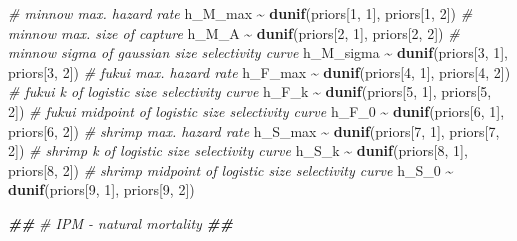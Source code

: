 \documentclass[
]{article}
\newenvironment{Shaded}{\begin{snugshade}}{\end{snugshade}}
\newcommand{\CommentTok}[1]{\textcolor[rgb]{0.56,0.35,0.01}{\textit{#1}}}
\newcommand{\DecValTok}[1]{\textcolor[rgb]{0.00,0.00,0.81}{#1}}
\newcommand{\DocumentationTok}[1]{\textcolor[rgb]{0.56,0.35,0.01}{\textbf{\textit{#1}}}}
\newcommand{\FunctionTok}[1]{\textcolor[rgb]{0.13,0.29,0.53}{\textbf{#1}}}
\newcommand{\NormalTok}[1]{#1}
\newcommand{\SpecialCharTok}[1]{\textcolor[rgb]{0.81,0.36,0.00}{\textbf{#1}}}
\begin{document}
\begin{Shaded}
\begin{Highlighting}[]
  \CommentTok{\# minnow max. hazard rate}
\NormalTok{  h\_M\_max }\SpecialCharTok{\textasciitilde{}} \FunctionTok{dunif}\NormalTok{(priors[}\DecValTok{1}\NormalTok{, }\DecValTok{1}\NormalTok{], priors[}\DecValTok{1}\NormalTok{, }\DecValTok{2}\NormalTok{])}
  \CommentTok{\# minnow max. size of capture}
\NormalTok{  h\_M\_A }\SpecialCharTok{\textasciitilde{}} \FunctionTok{dunif}\NormalTok{(priors[}\DecValTok{2}\NormalTok{, }\DecValTok{1}\NormalTok{], priors[}\DecValTok{2}\NormalTok{, }\DecValTok{2}\NormalTok{])}
  \CommentTok{\# minnow sigma of gaussian size selectivity curve}
\NormalTok{  h\_M\_sigma }\SpecialCharTok{\textasciitilde{}} \FunctionTok{dunif}\NormalTok{(priors[}\DecValTok{3}\NormalTok{, }\DecValTok{1}\NormalTok{], priors[}\DecValTok{3}\NormalTok{, }\DecValTok{2}\NormalTok{])}
  \CommentTok{\# fukui max. hazard rate}
\NormalTok{  h\_F\_max }\SpecialCharTok{\textasciitilde{}} \FunctionTok{dunif}\NormalTok{(priors[}\DecValTok{4}\NormalTok{, }\DecValTok{1}\NormalTok{], priors[}\DecValTok{4}\NormalTok{, }\DecValTok{2}\NormalTok{])}
  \CommentTok{\# fukui k of logistic size selectivity curve}
\NormalTok{  h\_F\_k }\SpecialCharTok{\textasciitilde{}} \FunctionTok{dunif}\NormalTok{(priors[}\DecValTok{5}\NormalTok{, }\DecValTok{1}\NormalTok{], priors[}\DecValTok{5}\NormalTok{, }\DecValTok{2}\NormalTok{])}
  \CommentTok{\# fukui midpoint of logistic size selectivity curve}
\NormalTok{  h\_F\_0 }\SpecialCharTok{\textasciitilde{}} \FunctionTok{dunif}\NormalTok{(priors[}\DecValTok{6}\NormalTok{, }\DecValTok{1}\NormalTok{], priors[}\DecValTok{6}\NormalTok{, }\DecValTok{2}\NormalTok{])}
  \CommentTok{\# shrimp max. hazard rate}
\NormalTok{  h\_S\_max }\SpecialCharTok{\textasciitilde{}} \FunctionTok{dunif}\NormalTok{(priors[}\DecValTok{7}\NormalTok{, }\DecValTok{1}\NormalTok{], priors[}\DecValTok{7}\NormalTok{, }\DecValTok{2}\NormalTok{])}
  \CommentTok{\# shrimp k of logistic size selectivity curve}
\NormalTok{  h\_S\_k }\SpecialCharTok{\textasciitilde{}} \FunctionTok{dunif}\NormalTok{(priors[}\DecValTok{8}\NormalTok{, }\DecValTok{1}\NormalTok{], priors[}\DecValTok{8}\NormalTok{, }\DecValTok{2}\NormalTok{])}
  \CommentTok{\# shrimp midpoint of logistic size selectivity curve}
\NormalTok{  h\_S\_0 }\SpecialCharTok{\textasciitilde{}} \FunctionTok{dunif}\NormalTok{(priors[}\DecValTok{9}\NormalTok{, }\DecValTok{1}\NormalTok{], priors[}\DecValTok{9}\NormalTok{, }\DecValTok{2}\NormalTok{])}

  \DocumentationTok{\#\#}
  \CommentTok{\# IPM {-} natural mortality}
  \DocumentationTok{\#\#}


\end{Highlighting}
\end{Shaded}
\end{document}

